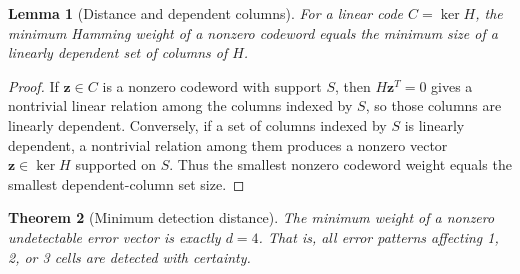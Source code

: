 \documentclass[11pt]{article}
\newtheorem{theorem}{Theorem}[subsection]
\newtheorem{lemma}[theorem]{Lemma}
\begin{document}
\begin{lemma}[Distance and dependent columns]
\label{lem:distance-columns}
For a linear code $C = \ker H$, the minimum Hamming weight of a nonzero codeword equals the minimum size of a linearly dependent set of columns of $H$.
\end{lemma}

\begin{proof}
If $\mathbf{z} \in C$ is a nonzero codeword with support $S$, then $H\mathbf{z}^{T} = 0$ gives a nontrivial linear relation among the columns indexed by $S$, so those columns are linearly dependent. Conversely, if a set of columns indexed by $S$ is linearly dependent, a nontrivial relation among them produces a nonzero vector $\mathbf{z} \in \ker H$ supported on $S$. Thus the smallest nonzero codeword weight equals the smallest dependent-column set size.
\end{proof}

\begin{theorem}[Minimum detection distance]
\label{thm:distance}
The minimum weight of a nonzero undetectable error vector is exactly $d = 4$. That is, all error patterns affecting 1, 2, or 3 cells are detected with certainty.
\end{theorem}
\end{document}
